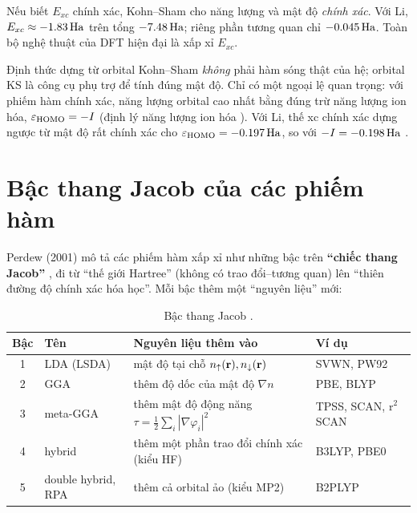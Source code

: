 Nếu biết $E_{xc}$ chính xác, Kohn--Sham cho năng lượng và mật độ \emph{chính xác}. Với Li, $E_{xc}\approx-1.83\,\mathrm{Ha}$ trên tổng $-7.48\,\mathrm{Ha}$; riêng phần tương quan chỉ $-0.045\,\mathrm{Ha}$. Toàn bộ nghệ thuật của DFT hiện đại là xấp xỉ $E_{xc}$.

\begin{hieulam}
Định thức dựng từ orbital Kohn--Sham \emph{không} phải hàm sóng thật của hệ; orbital KS là công cụ phụ trợ để tính đúng mật độ. Chỉ có một ngoại lệ quan trọng: với phiếm hàm chính xác, năng lượng orbital cao nhất bằng đúng trừ năng lượng ion hóa, $\varepsilon_{\rm HOMO}=-I$ (định lý năng lượng ion hóa \cite{PPLB1982}). Với Li, thế xc chính xác dựng ngược từ mật độ rất chính xác cho $\varepsilon_{\rm HOMO}=-0.197\,\mathrm{Ha}$, so với $-I=-0.198\,\mathrm{Ha}$ \cite{Kanungo2023}.
\end{hieulam}

\section{Bậc thang Jacob của các phiếm hàm}

Perdew (2001) mô tả các phiếm hàm xấp xỉ như những bậc trên \textbf{``chiếc thang Jacob''} \cite{PerdewSchmidt2001}, đi từ ``thế giới Hartree'' (không có trao đổi--tương quan) lên ``thiên đường độ chính xác hóa học''. Mỗi bậc thêm một ``nguyên liệu'' mới:

\begin{table}[h]
\centering\small
\caption{Bậc thang Jacob \cite{PerdewSchmidt2001}.}
\label{tab:jacob}
\begin{tabularx}{\textwidth}{@{}clXl@{}}
\toprule
Bậc & Tên & Nguyên liệu thêm vào & Ví dụ \\
\midrule
1 & LDA (LSDA) & mật độ tại chỗ $n_\uparrow(\mathbf r),n_\downarrow(\mathbf r)$ & SVWN, PW92 \\
2 & GGA & thêm độ dốc của mật độ $\nabla n$ & PBE, BLYP \\
3 & meta-GGA & thêm mật độ động năng $\tau=\tfrac12\sum_i|\nabla\varphi_i|^2$ & TPSS, SCAN, r$^2$SCAN \\
4 & hybrid & thêm một phần trao đổi chính xác (kiểu HF) & B3LYP, PBE0 \\
5 & double hybrid, RPA & thêm cả orbital ảo (kiểu MP2) & B2PLYP \\
\bottomrule
\end{tabularx}
\end{table}

